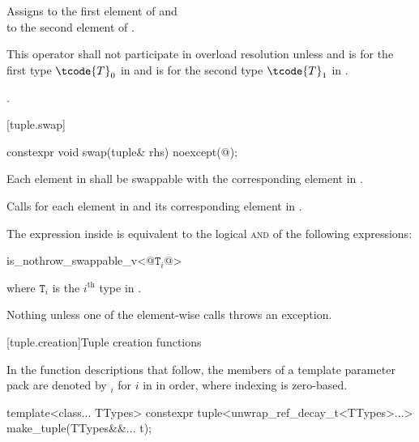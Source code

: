 \begin{itemdescr}
\pnum
\effects Assigns  to the first
element of  and\\  to the
second element of .

\pnum
\remarks
This operator shall not participate in overload resolution unless
 and
 is  for the first type $\tcode{T}_0$ in
 and  is  for the second
type $\tcode{T}_1$ in .

\pnum
\returns {}.
\end{itemdescr}

[tuple.swap]{}

%
\begin{itemdecl}
constexpr void swap(tuple& rhs) noexcept(@\seebelow@);
\end{itemdecl}

\begin{itemdescr}
\pnum
\requires
Each element in  shall be swappable with
the corresponding element in .

\pnum
\effects Calls  for each element in  and its
corresponding element in .

\pnum
\remarks The expression inside  is equivalent to the logical
\textsc{and} of the following expressions:

\begin{codeblock}
is_nothrow_swappable_v<@$\mathtt{T}_i$@>
\end{codeblock}
where $\mathtt{T}_i$ is the $i^\text{th}$ type in .

\pnum
\throws Nothing unless one of the element-wise  calls throws an exception.
\end{itemdescr}

[tuple.creation]{Tuple creation functions}

\pnum
In the function descriptions that follow, the members of a template parameter pack 
are denoted by $_i$ for $i$ in  in
order, where indexing is zero-based.

%
%
\begin{itemdecl}
template<class... TTypes>
  constexpr tuple<unwrap_ref_decay_t<TTypes>...> make_tuple(TTypes&&... t);
\end{itemdecl}

